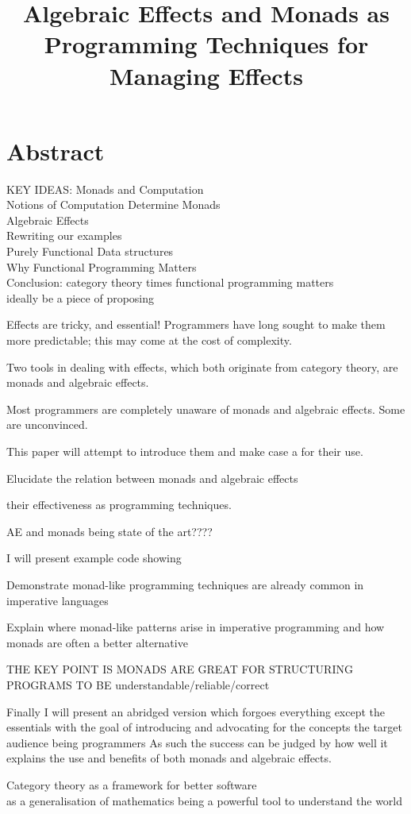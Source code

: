 \documentclass[a4paper,10pt]{article}
\title{Algebraic Effects and Monads as Programming Techniques for Managing Effects}
\theoremstyle{definition}
\begin{document}
\section{Abstract}

KEY IDEAS:
Monads and Computation\\
Notions of Computation Determine Monads\\
Algebraic Effects\\
Rewriting our examples\\
Purely Functional Data structures\\
Why Functional Programming Matters\\
Conclusion: category theory times functional programming matters\\
ideally be a piece of proposing

Effects are tricky, and essential!
Programmers have long sought to make them more predictable;
this may come at the cost of complexity.

Two tools in dealing with effects, which both originate from category theory,
are monads and algebraic effects.

Most programmers are completely unaware of monads and algebraic effects.
Some are unconvinced.

This paper will attempt to introduce them and make case a for their use.

Elucidate the relation between monads and algebraic effects

their effectiveness as programming techniques.

AE and monads being state of the art????

I will present example code showing

Demonstrate monad-like programming techniques are already common in imperative languages

Explain where monad-like patterns arise in imperative programming and how monads are often a better alternative

THE KEY POINT IS MONADS ARE GREAT FOR STRUCTURING PROGRAMS TO BE understandable/reliable/correct

Finally I will present an abridged version which forgoes everything except the essentials
with the goal of introducing and advocating for the concepts
the target audience being programmers
As such the success can be judged by how well it explains the use and benefits of both monads and algebraic effects.

Category theory as a framework for better software\\
as a generalisation of mathematics being a powerful tool to understand the world\\
\end{document}
